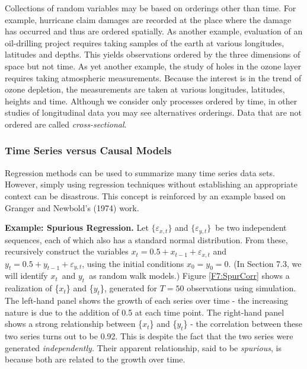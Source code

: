 Collections of random variables may be based on orderings other than time.
For example, hurricane claim damages are recorded at the place where the
damage has occurred and thus are ordered spatially. As another example,
evaluation of an oil-drilling project requires taking samples of the earth
at various longitudes, latitudes and depths. This yields observations
ordered by the three dimensions of space but not time. As yet another
example, the study of holes in the ozone layer requires taking atmospheric
measurements. Because the interest is in the trend of ozone depletion, the
measurements are taken at various longitudes, latitudes, heights and time.
Although we consider only processes ordered by time, in other studies of
longitudinal data you may see alternatives orderings. Data that are not
ordered are called \emph{cross-sectional}.


\subsubsection*{Time Series versus Causal Models}

Regression methods can be used to summarize many time series data
sets. However, simply using regression techniques without
establishing an appropriate context can be disastrous. This concept
is reinforced by an example based on Granger and Newbold's (1974)
work.

\linejed

\textbf{Example: Spurious Regression.} Let $\{\varepsilon_{x,t}\}$ and $%
\{\varepsilon_{y,t}\}$\ be two independent sequences, each of which
also has a standard normal distribution. From these, recursively
construct the variables $x_t = 0.5 + x_{t-1} + \varepsilon_{x,t}$
and $y_t = 0.5 + y_{t-1} + \varepsilon_{y,t}$, using the initial
conditions $x_0=y_0=0$. (In Section 7.3, we will identify $x_t$\ and
$y_t$\ as random walk models.) Figure \ref{F7:SpurCorr} shows a
realization of \{$x_t$\} and \{$y_t$\}, generated for $T=50$
observations using simulation. The left-hand panel shows the growth
of each series over time - the increasing nature is due to the
addition of 0.5 at each time point. The right-hand panel shows a
strong relationship between \{$x_t$\} and \{$y_t$\} - the
correlation between these two series turns out to be 0.92. This is
despite the fact that the two series were generated
\emph{independently. }Their apparent relationship, said to be
\emph{spurious}, is because both are related to the growth over
time.


